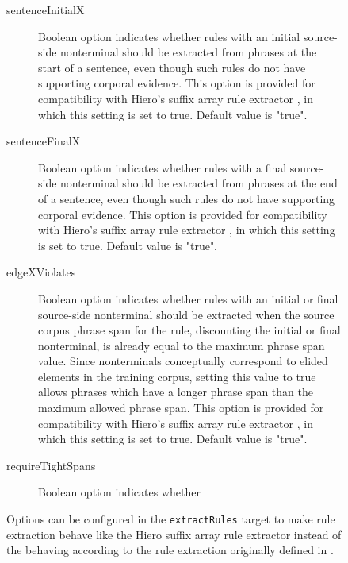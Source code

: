 \documentclass{pbml}
\newcommand{\newcite}{\namecite}
\begin{document}
\begin{figure}
\begin{description}

	\item[sentenceInitialX] Boolean option indicates whether rules with an initial source-side nonterminal should be extracted from phrases at the start of a sentence, even though such rules do not have supporting corporal evidence. This option is provided for compatibility with Hiero's suffix array rule extractor \cite{Lopez2008}, in which this setting is set to true. Default value is "true".

	\item[sentenceFinalX] Boolean option indicates whether rules with a final source-side nonterminal should be extracted from phrases at the end of a sentence, even though such rules do not have supporting corporal evidence. This option is provided for compatibility with Hiero's suffix array rule extractor \cite{Lopez2008}, in which this setting is set to true. Default value is "true".

	\item[edgeXViolates] Boolean option indicates whether rules with an initial or final source-side nonterminal should be extracted when the source corpus phrase span for the rule, discounting the initial or final nonterminal, is already equal to the maximum phrase span value. Since nonterminals conceptually correspond to elided elements in the training corpus, setting this value to true allows phrases which have a longer phrase span than the maximum allowed phrase span. This option is provided for compatibility with Hiero's suffix array rule extractor \cite{Lopez2008}, in which this setting is set to true. Default value is "true".

	\item[requireTightSpans] Boolean option indicates whether

\end{description}
\caption{Options can be configured in the {\tt extractRules} target to make rule extraction behave like the Hiero suffix array rule extractor {\protect \cite{Lopez2008} } instead of the behaving according to the rule extraction originally defined in {\protect \newcite{Chiang2005}} .}
\end{figure}
\end{document}
